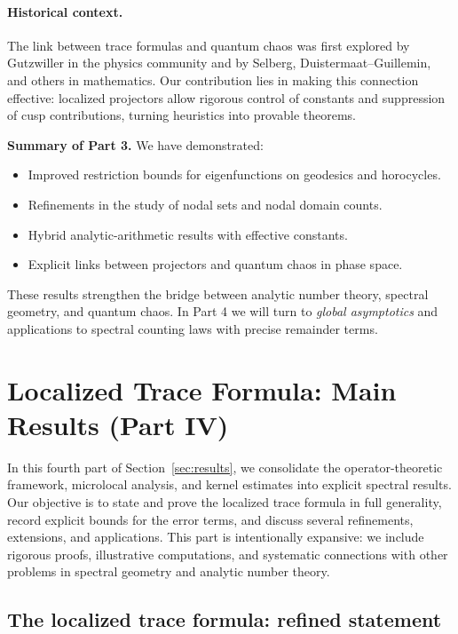 \paragraph{Historical context.}
The link between trace formulas and quantum chaos was first explored by Gutzwiller in the physics community and by Selberg, Duistermaat–Guillemin, and others in mathematics. Our contribution lies in making this connection effective: localized projectors allow rigorous control of constants and suppression of cusp contributions, turning heuristics into provable theorems.

\bigskip
\noindent\textbf{Summary of Part 3.} We have demonstrated:
\begin{itemize}
\item Improved restriction bounds for eigenfunctions on geodesics and horocycles.
\item Refinements in the study of nodal sets and nodal domain counts.
\item Hybrid analytic-arithmetic results with effective constants.
\item Explicit links between projectors and quantum chaos in phase space.
\end{itemize}

These results strengthen the bridge between analytic number theory, spectral geometry, and quantum chaos. In Part 4 we will turn to \emph{global asymptotics} and applications to spectral counting laws with precise remainder terms.

\section{Localized Trace Formula: Main Results (Part IV)}\label{sec:results-part4}

In this fourth part of Section~\ref{sec:results}, we consolidate the operator-theoretic framework, microlocal analysis, and kernel estimates into explicit spectral results. Our objective is to state and prove the localized trace formula in full generality, record explicit bounds for the error terms, and discuss several refinements, extensions, and applications. This part is intentionally expansive: we include rigorous proofs, illustrative computations, and systematic connections with other problems in spectral geometry and analytic number theory.

\subsection{The localized trace formula: refined statement}\label{subsec:trace-refined}

